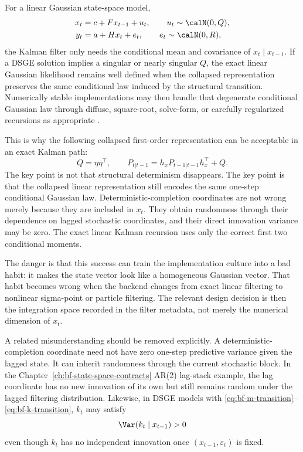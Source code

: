 For a linear Gaussian state-space model,
\begin{align}
  x_t &= c + F x_{t-1} + u_t,\qquad u_t \sim \calN(0,Q),\\
  y_t &= a + H x_t + e_t,\qquad e_t \sim \calN(0,R),
\end{align}
the Kalman filter only needs the conditional mean and covariance of
$x_t\mid x_{t-1}$.  If a DSGE solution implies a singular or nearly singular
$Q$, the exact linear Gaussian likelihood remains well defined when the
collapsed representation preserves the same conditional law induced by the
structural transition.  Numerically stable implementations may then handle that
degenerate conditional Gaussian law through diffuse, square-root, solve-form,
or carefully regularized recursions as appropriate \citep{durbin2012time}.

This is why the following collapsed first-order representation can be
acceptable in an exact Kalman path:
\[
  Q = \eta \eta^\top,\qquad
  P_{t|t-1} = h_x P_{t-1|t-1} h_x^\top + Q.
\]
The key point is not that structural determinism disappears.  The key point is
that the collapsed linear representation still encodes the same one-step
conditional Gaussian law.  Deterministic-completion coordinates are not wrong
merely because they are included in $x_t$.  They obtain randomness through
their dependence on lagged stochastic coordinates, and their direct innovation
variance may be zero.  The exact linear Kalman recursion uses only the correct
first two conditional moments.

The danger is that this success can train the implementation culture into a
bad habit: it makes the state vector look like a homogeneous Gaussian vector.
That habit becomes wrong when the backend changes from exact linear filtering
to nonlinear sigma-point or particle filtering.  The relevant design decision
is then the integration space recorded in the filter metadata, not merely the
numerical dimension of $x_t$.

A related misunderstanding should be removed explicitly.  A deterministic-
completion coordinate need not have zero one-step predictive variance given the
lagged state.  It can inherit randomness through the current stochastic block.
In the Chapter~\ref{ch:bf-state-space-contracts} AR(2) lag-stack example, the
lag coordinate has no new innovation of its own but still remains random under
the lagged filtering distribution.  Likewise, in DSGE models with
\eqref{eq:bf-m-transition}--\eqref{eq:bf-k-transition}, $k_t$ may satisfy
\[
  \Var(k_t\mid x_{t-1}) > 0
\]
even though $k_t$ has no independent innovation once $(x_{t-1},\varepsilon_t)$
is fixed.

